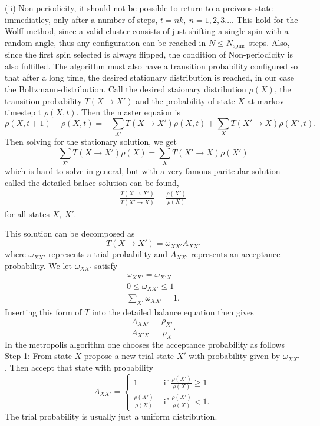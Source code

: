 \documentclass[a4paper]{article}
\newcommand{\trm}[1]{\textrm{#1}}
\newcommand{\oxx}{\omega_{XX'}}
\begin{document}
(ii) Non-periodicity, it should not be possible to return to a preivous state immediatley, only after a number of steps, $t =nk,~ n = 1,2,3\dots$.
This hold for the Wolff method, since a valid cluster consists of just shifting a single spin with a random angle, thus any configuration can be reached in $N \leq N_{\trm{spins}}$ steps. Also, since the first spin selected is always flipped, the condition of Non-periodicity is also fulfilled.
The algorithm must also have a transition probability configured so that after a long time, the desired stationary distribution is reached, in our case the Boltzmann-distribution.
Call the desired staionary distribution $\rho(X)$, the transition probability $T(X \rightarrow X')$ and the probability of state $X$ at markov timestep t $\rho(X,t)$.
Then the master equaion is 
\begin{equation}
  \rho(X, t+1) - \rho(X,t) = -\sum_{X'} T(X\rightarrow X')\rho(X,t) +\sum_{X} T(X'\rightarrow X)\rho(X',t).
\end{equation}
Then solving for the stationary solution, we get
\begin{equation}
  \sum_{X'}T(X\rightarrow X') \rho(X) =  \sum_{X}T(X'\rightarrow X) \rho(X')
\end{equation}
which is hard to solve in general, but with a very famous paritcular solution called the detailed balace solution can be found,
\begin{align}
  \frac{T(X\rightarrow X')}{T(X'\rightarrow X)} = \frac{\rho(X')}{\rho(X)} 
  \label{eq:detbal}
\end{align}
for all states $X,~X'$.

This solution can be decomposed as
\begin{equation}
  T(X\rightarrow X') = \omega_{XX'} A_{XX'}
\end{equation}
where $\oxx$ represents a trial probability and $A_{XX'}$ represents an acceptance probability.
We let $\omega_{XX'}$ satisfy
\begin{align}
  \oxx = \omega_{X'X}\\
  0 \leq \oxx \leq 1\\
  \sum_{X'} \oxx = 1.
\end{align}
Inserting this form of $T$ into the detailed balance equation then gives
\begin{equation}
  \frac{A_{XX'}}{A_{X'X}} = \frac{\rho_{X'}}{\rho_{X}}.
\end{equation}
In the metropolis algorithm one chooses the acceptance probability as follows
Step 1: From state $X$ propose a new trial state $X'$ with probability given by $\oxx$. Then accept that state with probability 
\begin{equation}
  A_{XX'} = 
  \begin{cases}
    	1 &\trm{ if } \frac{\rho(X')}{\rho(X)} \geq 1\\
	\frac{\rho(X')}{\rho(X)}&\trm{ if } \frac{\rho(X')}{\rho(X)} < 1 .
  \end{cases}
\end{equation}
The trial probability is usually just a uniform distribution.
\end{document}
